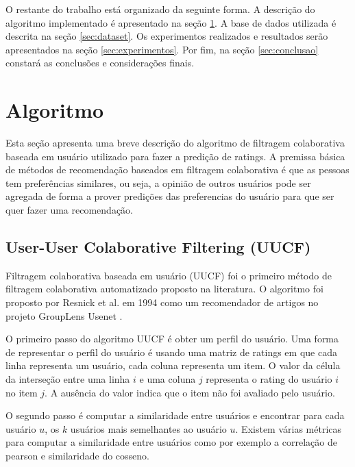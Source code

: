 \documentclass[12pt, a4paper, oneside]{article}
\begin{document}
O restante do trabalho está organizado da seguinte forma. A descrição do algoritmo implementado é apresentado na seç\~ao \ref{sec:algoritmo}. A base de dados utilizada é descrita na seç\~ao \ref{sec:dataset}. Os experimentos realizados e resultados serão apresentados na seção \ref{sec:experimentos}. Por fim, na seç\~ao \ref{sec:conclusao} constar\'a as conclus\~oes e consideraç\~oes finais.



\section{Algoritmo}
\label{sec:algoritmo}

Esta seção apresenta uma breve descrição do algoritmo de filtragem colaborativa
baseada em usuário utilizado para fazer a predição de ratings.
A premissa básica de métodos de recomendação baseados em filtragem colaborativa é 
que as pessoas tem preferências similares, ou seja, a opinião de outros usuários pode ser
agregada de forma a prover predições das preferencias do usuário para que ser quer
fazer uma recomendação.

\subsection{User-User Colaborative Filtering (UUCF)}
\label{sec:user-to-user}
Filtragem colaborativa baseada em usuário (UUCF) foi o primeiro método de 
filtragem colaborativa automatizado proposto na literatura\cite{ekstrand2011collaborative}. O algoritmo foi proposto por Resnick et al. em 1994 como um recomendador de artigos no projeto GroupLens Usenet \cite{resnick1994grouplens}.

O primeiro passo do algoritmo UUCF é obter um perfil do usuário. Uma forma de 
representar o perfil do usuário é usando uma matriz de ratings em que cada linha 
representa um usuário, cada coluna representa um item. O valor da célula da interseção
entre uma linha $i$ e uma coluna $j$ representa o rating do usuário $i$ no item $j$.
A ausência do valor indica que o item não foi avaliado pelo usuário.

O segundo passo é computar a similaridade entre usuários e encontrar para cada usuário $u$,
os $k$ usuários mais semelhantes ao usuário $u$. Existem várias métricas 
para computar a similaridade entre usuários como por exemplo a correlação de pearson
e similaridade do cosseno.
\end{document}
